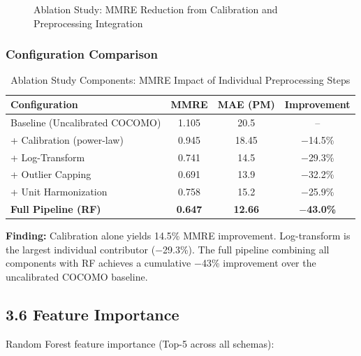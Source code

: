 \documentclass[11pt,a4paper]{article}
\begin{document}
\begin{figure}[h]
\caption{Ablation Study: MMRE Reduction from Calibration and Preprocessing Integration}
\label{fig:ablation}
\end{figure}

\subsubsection{Configuration Comparison}

\begin{table}[h]
\centering
\caption{Ablation Study Components: MMRE Impact of Individual Preprocessing Steps}
\label{tab:ablation}
\begin{tabular}{|l|c|c|c|}
\hline
\textbf{Configuration} & \textbf{MMRE} & \textbf{MAE (PM)} & \textbf{Improvement} \\
\hline
Baseline (Uncalibrated COCOMO) & 1.105 & 20.5 & -- \\
\hline
+ Calibration (power-law) & 0.945 & 18.45 & $-$14.5\% \\
+ Log-Transform & 0.741 & 14.5 & $-$29.3\% \\
+ Outlier Capping & 0.691 & 13.9 & $-$32.2\% \\
+ Unit Harmonization & 0.758 & 15.2 & $-$25.9\% \\
\hline
\textbf{Full Pipeline (RF)} & \textbf{0.647} & \textbf{12.66} & \textbf{$-$43.0\%} \\
\hline
\end{tabular}
\end{table}

\textbf{Finding:} Calibration alone yields 14.5\% MMRE improvement. Log-transform is the largest individual contributor ($-$29.3\%). The full pipeline combining all components with RF achieves a cumulative $-$43\% improvement over the uncalibrated COCOMO baseline.

\subsection{3.6 Feature Importance}

Random Forest feature importance (Top-5 across all schemas):
\end{document}
